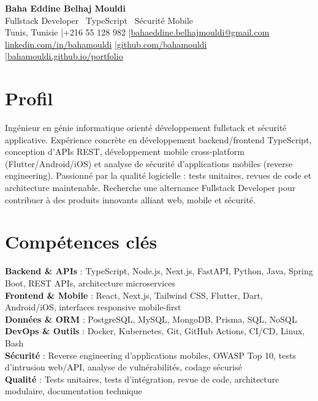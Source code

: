 \documentclass[a4paper,10pt]{article}
\begin{document}
\begin{center}
{\LARGE\bfseries\color{navy} Baha Eddine Belhaj Mouldi}\\[3pt]
{\large Fullstack Developer \textbar\ TypeScript \textbar\ Sécurité Mobile}\\[5pt]
Tunis, Tunisie \quad|\quad +216 55 128 982 \quad|\quad \href{mailto:bahaeddine.belhajmouldi@gmail.com}{bahaeddine.belhajmouldi@gmail.com}\\[1pt]
\href{https://www.linkedin.com/in/bahamouldi}{linkedin.com/in/bahamouldi} \quad|\quad \href{https://github.com/bahamouldi}{github.com/bahamouldi} \quad|\quad \href{https://bahamouldi.github.io/portfolio/}{bahamouldi.github.io/portfolio}
\end{center}
\vspace{1pt}
\section{Profil}
Ingénieur en génie informatique orienté développement fullstack et sécurité applicative. Expérience concrète en développement backend/frontend TypeScript, conception d'APIs REST, développement mobile cross-platform (Flutter/Android/iOS) et analyse de sécurité d'applications mobiles (reverse engineering). Passionné par la qualité logicielle : tests unitaires, revues de code et architecture maintenable. Recherche une alternance Fullstack Developer pour contribuer à des produits innovants alliant web, mobile et sécurité.
\section{Compétences clés}
\textbf{Backend \& APIs} : TypeScript, Node.js, Next.js, FastAPI, Python, Java, Spring Boot, REST APIs, architecture microservices\\[0.5pt]
\textbf{Frontend \& Mobile} : React, Next.js, Tailwind CSS, Flutter, Dart, Android/iOS, interfaces responsive mobile-first\\[0.5pt]
\textbf{Données \& ORM} : PostgreSQL, MySQL, MongoDB, Prisma, SQL, NoSQL\\[0.5pt]
\textbf{DevOps \& Outils} : Docker, Kubernetes, Git, GitHub Actions, CI/CD, Linux, Bash\\[0.5pt]
\textbf{Sécurité} : Reverse engineering d'applications mobiles, OWASP Top 10, tests d'intrusion web/API, analyse de vulnérabilités, codage sécurisé\\[0.5pt]
\textbf{Qualité} : Tests unitaires, tests d'intégration, revue de code, architecture modulaire, documentation technique
\end{document}
